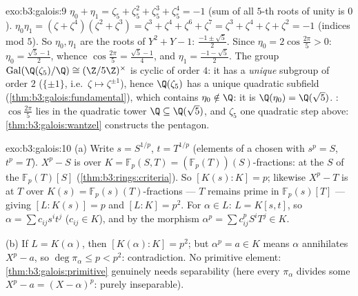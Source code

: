 \begin{solution}{exo:b3:galois:9}
$\eta_0 + \eta_1 = \zeta_5 + \zeta_5^2 + \zeta_5^3 + \zeta_5^4 =
-1$ (sum of all $5$-th roots of unity is $0$). $\eta_0\eta_1 =
(\zeta + \zeta^4)(\zeta^2 + \zeta^3) = \zeta^3 + \zeta^4 +
\zeta^6 + \zeta^7 = \zeta^3 + \zeta^4 + \zeta + \zeta^2 = -1$
(indices mod $5$). So $\eta_0, \eta_1$ are the roots of $Y^2 + Y
- 1$: $\frac{-1 \pm \sqrt5}2$. Since $\eta_0 =
2\cos\frac{2\pi}5 > 0$: $\eta_0 = \frac{\sqrt5 - 1}2$, whence
$\cos\frac{2\pi}5 = \frac{\sqrt5 - 1}4$, and $\eta_1 =
\frac{-1-\sqrt5}2$. The group
$\operatorname{Gal}(\Q(\zeta_5)/\Q) \cong (\Z/5\Z)^\times$ is
cyclic of order $4$: it has a \emph{unique} subgroup of order
$2$ ($\{\pm 1\}$, i.e.\ $\zeta \mapsto \zeta^{\pm1}$), hence
$\Q(\zeta_5)$ has a unique quadratic subfield
(\cref{thm:b3:galois:fundamental}), which contains $\eta_0
\notin \Q$: it is $\Q(\eta_0) = \Q(\sqrt5)$. :
$\cos\frac{2\pi}5$ lies in the quadratic tower $\Q \subseteq
\Q(\sqrt5)$, and $\zeta_5$ one quadratic step above:
\cref{thm:b3:galois:wantzel} constructs the pentagon.
\end{solution}

\begin{solution}{exo:b3:galois:10}
(a) Write $s = S^{1/p}$, $t = T^{1/p}$ (elements of a chosen
 with $s^p = S$, $t^p = T$). $X^p - S$ is
 over $K = \mathbb F_p(S, T) = (\mathbb
F_p(T))(S)$-fractions:  at the  $S$ of
the  $\mathbb F_p(T)[S]$ (\cref{thm:b3:rings:criteria}). So
$[K(s):K] = p$; likewise $X^p - T$ is  at $T$ over
$K(s) = \mathbb F_p(s)(T)$-fractions --- $T$ remains prime in
$\mathbb F_p(s)[T]$ --- giving $[L : K(s)] = p$ and $[L:K] =
p^2$. For $\alpha \in L$: $L = K[s, t]$, so $\alpha = \sum
c_{ij}s^it^j$ ($c_{ij} \in K$), and by the  morphism
$\alpha^p = \sum c_{ij}^p S^iT^j \in K$.

(b) If $L = K(\alpha)$, then $[K(\alpha):K] = p^2$; but
$\alpha^p = a \in K$ means $\alpha$ annihilates $X^p - a$, so
$\deg\pi_\alpha \leq p < p^2$: contradiction. No primitive
element: \cref{thm:b3:galois:primitive} genuinely needs
separability (here every $\pi_\alpha$ divides some $X^p - a =
(X - \alpha)^p$: purely inseparable).
\end{solution}

